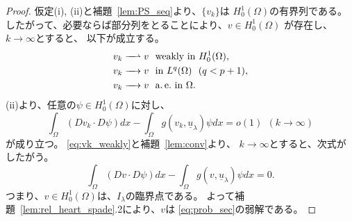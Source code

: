 \begin{proof}
 仮定(i), (ii)と補題~\ref{lem:PS_seq}より、$\{v_k \}$は
 $H_0^1(\Omega)$の有界列である。
 したがって、必要ならば部分列をとることにより、$v \in H_0^1(\Omega)$
 が存在し、$k \to \infty$とすると、
 以下が成立する。
 \begin{align}
  v_k \xrightharpoonup{ \mbox{ ~ } } v & \ \ \text{weakly~} \tin
  H_0^1(\Omega), \label{eq:vk_weakly} \\
  v_k \xrightarrow{ \mbox{ ~ } } v & \ \ \tin L^q(\Omega) \ \
   (q < p+1), \label{eq:vk_Lq} \\
  v_k \xrightarrow{ \mbox{ ~ } } v & \ \ \ae \tin \Omega. 
    \label{eq:vk_ae}
 \end{align}
 (ii)より、任意の$\psi \in H_0^1(\Omega)$に対し、
 \[
 \int_\Omega (Dv_k \cdot D\psi) dx - \int_\Omega g(v_k,
 \underline{u}_\lambda) \psi dx = o(1) \ \ (k \to \infty)
 \]
 が成り立つ。
 \eqref{eq:vk_weakly}と補題~\ref{lem:conv}より、
 $k \to \infty$とすると、次式がしたがう。
 \begin{equation}
  \int_\Omega (Dv \cdot D\psi) dx - \int_\Omega g(v,
   \underline{u}_\lambda) \psi dx = 0. \label{eq:intvpsi}
 \end{equation}
 つまり、$v \in H_0^1(\Omega)$は、$I_\lambda$の臨界点である。
 よって補題~\ref{lem:rel_heart_spade}.2により、$v$は
 \ref{eq:prob_sec}の弱解である。


\end{proof}
